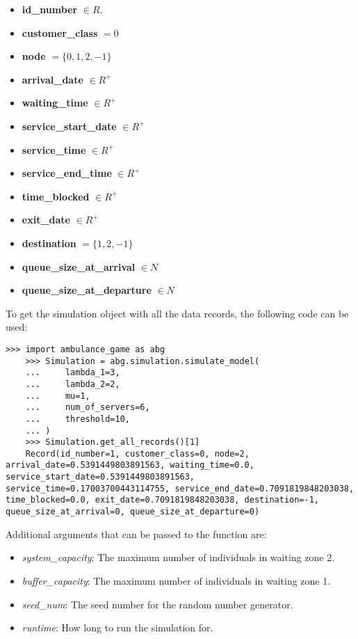\begin{multicols}{2}
    \begin{itemize}
        \item \textbf{id\_number} \(\in R\).
        \item \textbf{customer\_class} \(= 0\)
        \item \textbf{node} \(= \{0, 1, 2, -1 \} \)
        \item \textbf{arrival\_date} \( \in R^+ \)
        \item \textbf{waiting\_time} \( \in R^+ \)
        \item \textbf{service\_start\_date} \( \in R^+ \)
        \item \textbf{service\_time} \( \in R^+ \)
        \item \textbf{service\_end\_time} \( \in R^+ \)
        \item \textbf{time\_blocked} \( \in R^+ \)
        \item \textbf{exit\_date} \( \in R^+ \)
        \item \textbf{destination} \( = \{1, 2, -1\} \)
        \item \textbf{queue\_size\_at\_arrival} \( \in N \)
        \item \textbf{queue\_size\_at\_departure} \( \in N \)
    \end{itemize}
\end{multicols}

To get the simulation object with all the data records, the following code can be
used:
\begin{lstlisting}[style=pystyle]
    >>> import ambulance_game as abg
    >>> Simulation = abg.simulation.simulate_model(
    ...     lambda_1=3,
    ...     lambda_2=2,
    ...     mu=1,
    ...     num_of_servers=6,
    ...     threshold=10,
    ... )
    >>> Simulation.get_all_records()[1]
    Record(id_number=1, customer_class=0, node=2, arrival_date=0.5391449803891563, waiting_time=0.0, service_start_date=0.5391449803891563, service_time=0.17003700443114755, service_end_date=0.7091819848203038, time_blocked=0.0, exit_date=0.7091819848203038, destination=-1, queue_size_at_arrival=0, queue_size_at_departure=0)
\end{lstlisting}

Additional arguments that can be passed to the function are:
\begin{itemize}
    \item \textit{system\_capacity}: The maximum number of individuals in 
    waiting zone 2.
    \item \textit{buffer\_capacity}: The maximum number of individuals in 
    waiting zone 1.
    \item \textit{seed\_num}: The seed number for the random number generator.
    \item \textit{runtime}: How long to run the simulation for.
\end{itemize}

